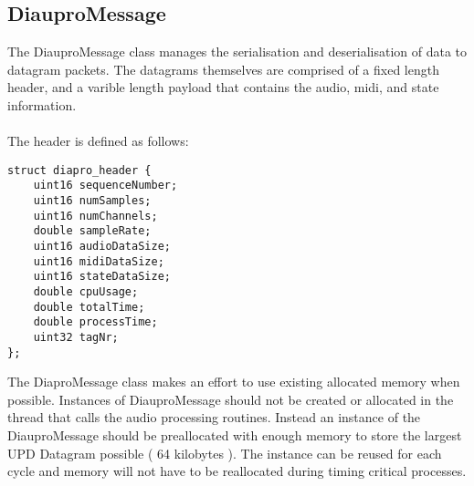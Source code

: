 \subsection{DiauproMessage}

The DiauproMessage class manages the serialisation and deserialisation of data to datagram packets. The datagrams themselves are comprised of a fixed length header, and a varible length payload that contains the audio, midi, and state information.\\
\\
The header is defined as follows:

\begin{lstlisting}
struct diapro_header {
    uint16 sequenceNumber;
    uint16 numSamples;
    uint16 numChannels;
    double sampleRate;
    uint16 audioDataSize;
    uint16 midiDataSize;
    uint16 stateDataSize;
    double cpuUsage;
    double totalTime;
    double processTime;
    uint32 tagNr;
};
\end{lstlisting}

The DiaproMessage class makes an effort to use existing allocated memory when possible. Instances of DiauproMessage should not be created or allocated in the thread that calls the audio processing routines. Instead an instance of the DiauproMessage should be preallocated with enough memory to store the largest UPD Datagram possible ( 64 kilobytes ). The instance can be reused for each cycle and memory will not have to be reallocated during timing critical processes.

